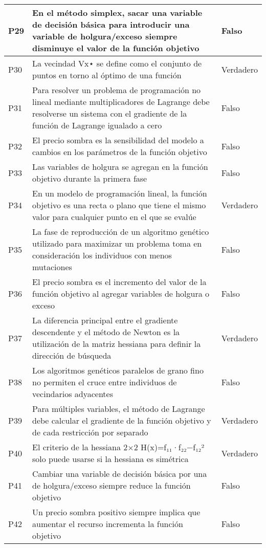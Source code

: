 \documentclass{article}
\begin{document}
\begin{longtable}{|>{\centering\arraybackslash}p{1.5cm}|>{\raggedright\arraybackslash}p{14cm}|>{\centering\arraybackslash}p{2cm}|}
\hline
P29 & En el método simplex, sacar una variable de decisión básica para introducir una variable de holgura/exceso siempre disminuye el valor de la función objetivo & Falso \\
\hline
P30 & La vecindad Vx⋆ se define como el conjunto de puntos en torno al óptimo de una función & Verdadero \\
\hline
P31 & Para resolver un problema de programación no lineal mediante multiplicadores de Lagrange debe resolverse un sistema con el gradiente de la función de Lagrange igualado a cero & Falso \\
\hline
P32 & El precio sombra es la sensibilidad del modelo a cambios en los parámetros de la función objetivo & Falso \\
\hline
P33 & Las variables de holgura se agregan en la función objetivo durante la primera fase & Falso \\
\hline
P34 & En un modelo de programación lineal, la función objetivo es una recta o plano que tiene el mismo valor para cualquier punto en el que se evalúe & Verdadero \\
\hline
P35 & La fase de reproducción de un algoritmo genético utilizado para maximizar un problema toma en consideración los individuos con menos mutaciones & Falso \\
\hline
P36 & El precio sombra es el incremento del valor de la función objetivo al agregar variables de holgura o exceso & Falso \\
\hline
P37 & La diferencia principal entre el gradiente descendente y el método de Newton es la utilización de la matriz hessiana para definir la dirección de búsqueda & Verdadero \\
\hline
P38 & Los algoritmos genéticos paralelos de grano fino no permiten el cruce entre individuos de vecindarios adyacentes & Falso \\
\hline
P39 & Para múltiples variables, el método de Lagrange debe calcular el gradiente de la función objetivo y de cada restricción por separado & Verdadero \\
\hline
P40 & El criterio de la hessiana 2×2 H(x)=f₁₁·f₂₂−f₁₂² solo puede usarse si la hessiana es simétrica & Verdadero \\
\hline
P41 & Cambiar una variable de decisión básica por una de holgura/exceso siempre reduce la función objetivo & Falso \\
\hline
P42 & Un precio sombra positivo siempre implica que aumentar el recurso incrementa la función objetivo & Falso \\

\end{longtable}
\end{document}
